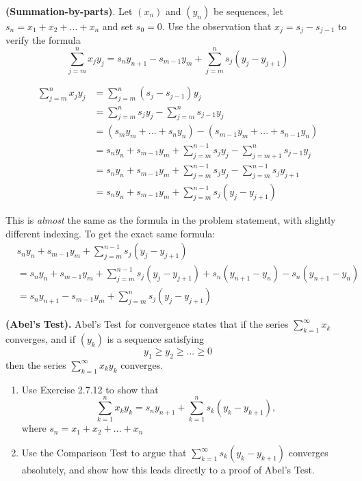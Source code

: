 \documentclass{oxmathproblems}
\begin{document}
\begin{questions}
\miquestion \textbf{(Summation-by-parts)}. Let $(x_{n})$ and $(y_{n})$ be sequences, let $s_{n} = x_{1}+x_{2}+...+x_{n}$ and set $s_{0}=0$. Use the observation that
$x_{j} = s_{j} - s_{j-1}$ to verify the formula
\[\sum_{j=m}^{n}x_{j}y_{j} = s_{n}y_{n+1} - s_{m-1}y_{m} + \sum_{j=m}^{n}s_{j}(y_{j}-y_{j+1})\]

\begin{solution}
  \begin{align*}
    \sum_{j=m}^{n}x_{j}y_{j}
    &= \sum_{j=m}^{n}(s_{j}-s_{j-1})y_{j} \\
    &= \sum_{j=m}^{n}s_{j}y_{j} - \sum_{j=m}^{n}s_{j-1}y_{j} \\
    &= (s_{m}y_{m} + ... + s_{n}y_{n}) - (s_{m-1}y_{m} + ... + s_{n-1}y_{n}) \\
    &= s_{n}y_{n} + s_{m-1}y_{m} + \sum_{j=m}^{n-1}s_{j}y_{j} - \sum_{j=m+1}^{n}s_{j-1}y_{j} \\
    &= s_{n}y_{n} + s_{m-1}y_{m} + \sum_{j=m}^{n-1}s_{j}y_{j} - \sum_{j=m}^{n-1}s_{j}y_{j+1} \\ 
    &= s_{n}y_{n} + s_{m-1}y_{m} + \sum_{j=m}^{n-1}s_{j}(y_{j}-y_{j+1})
  \end{align*}

  This is \textit{almost} the same as the formula in the problem statement, with slightly different indexing. To get the exact same formula:
  \begin{align*}
    &s_{n}y_{n} + s_{m-1}y_{m} + \sum_{j=m}^{n-1}s_{j}(y_{j}-y_{j+1}) \\
    &= s_{n}y_{n} + s_{m-1}y_{m} + \sum_{j=m}^{n-1}s_{j}(y_{j}-y_{j+1}) + s_{n}(y_{n+1}-y_{n}) - s_{n}(y_{n+1}-y_{n}) \\
    &= s_{n}y_{n+1} - s_{m-1}y_{m} + \sum_{j=m}^{n}s_{j}(y_{j}-y_{j+1})
\end{align*}
\end{solution}

\miquestion \textbf{(Abel's Test).} Abel's Test for convergence states that if the series $\sum_{k=1}^{\infty}x_{k}$ converges, and if $(y_{k})$ is a sequence satisfying
\[y_{1} \geq y_{2} \geq ... \geq 0\]
then the series $\sum_{k=1}^{\infty}x_{k}y_{k}$ converges.
\begin{enumerate}[label=(\alph*)]
  \item Use Exercise 2.7.12 to show that
  \[\sum_{k=1}^{n}x_{k}y_{k} = s_{n}y_{n+1} + \sum_{k=1}^{n}s_{k}(y_{k}-y_{k+1}),\]
  where $s_{n} = x_{1} + x_{2} + ... + x_{n}$
  \item Use the Comparison Test to argue that $\sum_{k=1}^{\infty}s_{k}(y_{k}-y_{k+1})$ converges absolutely, and show how this leads directly to a proof of Abel's Test.
\end{enumerate}


\end{questions}
\end{document}
